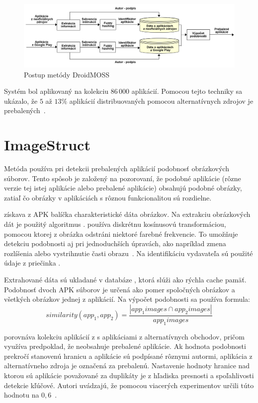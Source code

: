 \begin{figure}[htb]
  \begin{center}
    \includegraphics[width=130mm]{images/DroidMoss.png}
  \end{center}
  \caption{Postup metódy DroidMOSS}
  \label{fig:strukturaApk}
\end{figure}


Systém  bol aplikovaný na kolekciu $86\,000$ aplikácií. Pomocou tejto techniky sa ukázalo, že $5$ až $13\%$  aplikácií distribuovaných pomocou alternatívnych zdrojov je prebalených~\cite{DetectingRepackagedZhou}.


\section{ImageStruct}
Metóda  používa pri detekcii prebalených aplikácií podobnosť obrázkových súborov. Tento spôsob je založený na pozorovaní, že podobné aplikácie (rôzne verzie tej istej aplikácie alebo prebalené aplikácie) obsahujú podobné obrázky, zatiaľ čo obrázky v aplikáciách s rôznou funkcionalitou sú rozdielne. 


 získava z APK balíčka charakteristické dáta obrázkov. Na extrakciu obrázkových dát je použitý algoritmus .  používa diskrétnu kosínusovú transformáciou, pomocou ktorej z obrázka odstráni niektoré farebné frekvencie. To umožňuje detekciu podobnosti aj pri jednoduchších úpravách, ako napríklad zmena rozlíšenia alebo vystrihnutie časti obrazu~\cite{pHash}. Na identifikáciu vydavateľa sú použité údaje z priečinka .


Extrahované dáta sú ukladané v databáze , ktorá slúži ako rýchla cache pamäť. 
Podobnosť dvoch APK súborov je určená ako pomer spoločných obrázkov a všetkých obrázkov jednej z aplikácií. Na výpočet podobnosti sa používa formula:
\[ similarity(app_1, app_2) = \frac{|app_{1}images \cap app_{2}images|} { app_{1}images} \]


  porovnáva kolekciu aplikácií z  s aplikáciami z alternatívnych obchodov, pričom využíva predpoklad, že  neobsahuje prebalené aplikácie. Ak hodnota podobnosti prekročí stanovenú hranicu a aplikácie sú podpísané rôznymi autormi, aplikácia z alternatívneho zdroja je označená za prebalenú.
Nastavenie hodnoty hranice nad ktorou sú aplikácie považované za duplikáty je z hľadiska presnosti a spoľahlivosti detekcie kľúčové. Autori uvádzajú, že pomocou viacerých experimentov určili túto hodnotu na $0,6$~\cite{ImageStruct}.

